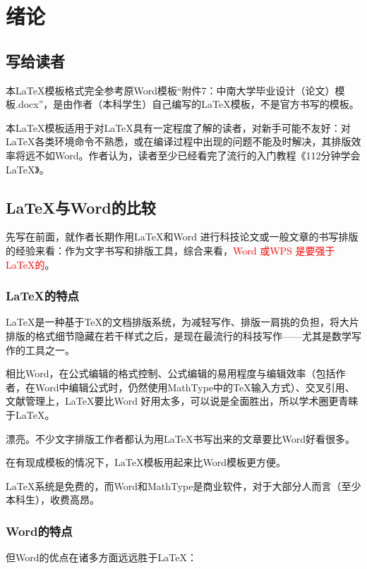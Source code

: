 \newpage\vspace*{-21.6pt}
\section{绪论}%
\subsection{写给读者}
本\LaTeX 模板格式完全参考原Word模板“附件7：中南大学毕业设计（论文）模板.docx”，是由作者（本科学生）自己编写的\LaTeX 模板，不是官方书写的模板。

本\LaTeX 模板适用于对\LaTeX 具有一定程度了解的读者，对新手可能不友好：对\LaTeX 各类环境命令不熟悉，或在编译过程中出现的问题不能及时解决，其排版效率将远不如Word。作者认为，读者至少已经看完了流行的入门教程《112分钟学会\LaTeX 》。

\subsection{\LaTeX 与Word的比较}
先写在前面，就作者长期作用\LaTeX 和Word 进行科技论文或一般文章的书写排版的经验来看：作为文字书写和排版工具，综合来看，\textcolor{red}{Word 或WPS 是要强于\LaTeX 的}。

\subsubsection{\LaTeX 的特点}
\LaTeX 是一种基于\TeX 的文档排版系统，为减轻写作、排版一肩挑的负担，将大片排版的格式细节隐藏在若干样式之后，是现在最流行的科技写作——尤其是数学写作的工具之一。

相比Word，在公式编辑的格式控制、公式编辑的易用程度与编辑效率（包括作者，在Word中编辑公式时，仍然使用MathType中的\TeX 输入方式）、交叉引用、文献管理上，\LaTeX 要比Word 好用太多，可以说是全面胜出，所以学术圈更青睐于\LaTeX 。

漂亮。不少文字排版工作者都认为用\LaTeX 书写出来的文章要比Word好看很多。

在有现成模板的情况下，\LaTeX 模板用起来比Word模板更方便。

\LaTeX 系统是免费的，而Word和MathType是商业软件，对于大部分人而言（至少本科生），收费高昂。

\subsubsection{Word的特点}
但Word的优点在诸多方面远远胜于\LaTeX ：

